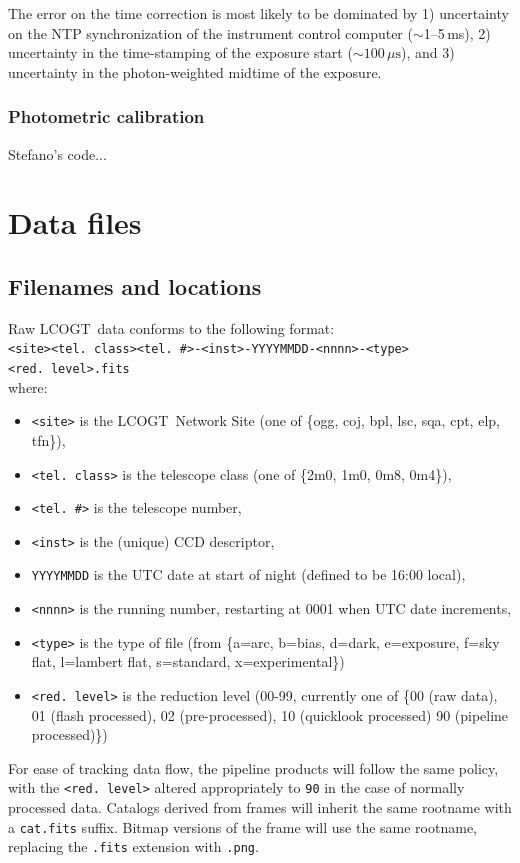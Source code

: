 \documentclass[twoside,11pt]{article}
\renewcommand{\_}{\texttt{\symbol{95}}}
\newcommand{\LCO}{LCOGT}
\newcommand{\rmn}[1] {\mathrm{#1}}
\begin{document}
The error on the time correction is most likely to be dominated by 1)
uncertainty on the NTP synchronization of the instrument control computer
($\sim$1--5\,ms), 2) uncertainty in the time-stamping of the exposure start
($\sim 100\,\mu\rmn{s}$), and 3) uncertainty in the photon-weighted midtime of the
exposure.

\subsubsection{Photometric calibration}
Stefano's code...

\section{Data files}

\subsection{Filenames and locations}
Raw \LCO\ data conforms to the following format:\\
\texttt{<site><tel.\ class><tel.\ \#>-<inst>-YYYYMMDD-<nnnn>-<type><red.\ level>.fits}\\
where:
\begin{itemize}
\item{\texttt{<site>}} is the \LCO\ Network Site (one of \{ogg, coj, bpl, lsc, sqa, cpt, elp, tfn\}),
\item{\texttt{<tel.\ class>}} is the telescope class (one of \{2m0, 1m0, 0m8, 0m4\}),
\item{\texttt{<tel.\ \#>}} is the telescope number,
\item{\texttt{<inst>}} is the (unique) CCD descriptor,
\item{\texttt{YYYYMMDD}} is the UTC date at start of night (defined to be 16:00 local),
\item{\texttt{<nnnn>}} is the running number, restarting at 0001 when UTC date increments,
\item{\texttt{<type>}} is the type of file (from \{a=arc, b=bias, d=dark, e=exposure, f=sky flat, l=lambert flat, s=standard, x=experimental\}) 
\item{\texttt{<red.\ level>}} is the reduction level (00-99, currently one of
\{00 (raw data), 01 (flash processed), 02 (pre-processed), 10 (quicklook
processed) 90 (pipeline processed)\})
\end{itemize}

For ease of tracking data flow, the pipeline products will follow the same
policy, with the \texttt{<red.\ level>} altered appropriately to \texttt{90} in
the case of normally processed data. Catalogs derived from frames will inherit
the same rootname with a \texttt{\_cat.fits} suffix. Bitmap versions of the
frame will use the same rootname, replacing the \texttt{.fits} extension with
\texttt{.png}.
\end{document}

